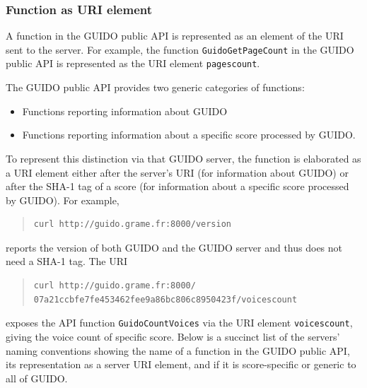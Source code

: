 \documentclass{article}
\newcommand{\guidosize}{6pt}
\begin{document}
\subsubsection{Function as URI element}
A function in the GUIDO public API is represented as an element of the URI sent to the server.  For example, the function \verb=GuidoGetPageCount= in the GUIDO public API is represented as the URI element \verb=pagescount=.\par
The GUIDO public API provides two generic categories of functions:
\begin{itemize}
\item Functions reporting information about GUIDO
\item Functions reporting information about a specific score processed by GUIDO.
\end{itemize}
To represent this distinction via that GUIDO server, the function is elaborated as a URI element either after the server's URI (for information about GUIDO) or after the SHA-1 tag of a score (for information about a specific score processed by GUIDO).  For example,
\begin{quote}
\begingroup
\fontsize{\guidosize}{12pt}\selectfont
\begin{verbatim}
curl http://guido.grame.fr:8000/version
\end{verbatim}
\endgroup
\end{quote}
reports the version of both GUIDO and the GUIDO server and thus does not need a SHA-1 tag.  The URI
\begin{quote}
\begingroup
\fontsize{\guidosize}{12pt}\selectfont
\begin{verbatim}
curl http://guido.grame.fr:8000/
07a21ccbfe7fe453462fee9a86bc806c8950423f/voicescount
\end{verbatim}
\endgroup
\end{quote}
exposes the API function \verb=GuidoCountVoices= via the URI element \verb=voicescount=, giving the voice count of specific score.  Below is a succinct list of the servers' naming conventions showing the name of a function in the GUIDO public API, its representation as a server URI element, and if it is score-specific or generic to all of GUIDO.
\end{document}
